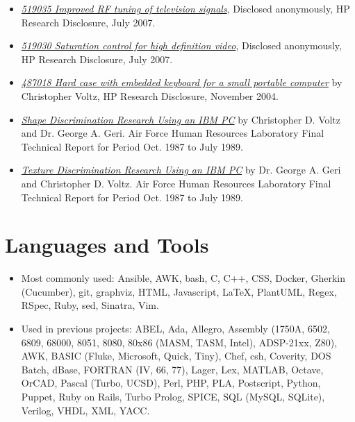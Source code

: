 \documentclass[10pt,letterpaper,oneside]{report}
\begin{document}
\begin{itemize}
  \item \href{http://voltz.ws/resume/RD519035.pdf}
    {\textit{519035 Improved RF tuning of television signals}}, Disclosed
    anonymously, HP Research Disclosure, July 2007.

  \item \href{http://voltz.ws/resume/RD519030.pdf}
    {\textit{519030 Saturation control for high definition video}}, Disclosed
    anonymously, HP Research Disclosure, July 2007.

  \item \href{http://voltz.ws/resume/RD487018.pdf}
    {\textit{487018 Hard case with embedded keyboard for a small portable
    computer}} by Christopher Voltz, HP Research Disclosure, November 2004.

  \item \href{http://www.dtic.mil/docs/citations/ADA219993}
    {\textit{Shape Discrimination Research Using an IBM PC}} by Christopher D.
    Voltz and Dr.  George A. Geri. Air Force Human Resources Laboratory Final
    Technical Report for Period Oct. 1987 to July 1989.

  \item \href{http://www.dtic.mil/docs/citations/ADA224347}
    {\textit{Texture Discrimination Research Using an IBM PC}} by Dr. George A.
    Geri and Christopher D. Voltz. Air Force Human Resources Laboratory Final
    Technical Report for Period Oct. 1987 to July 1989.
\end{itemize}

\section{Languages and Tools}

\begin{itemize}
  \item Most commonly used: Ansible, AWK, bash, C, C++, CSS, Docker, Gherkin
    (Cucumber), git, graphviz, HTML, Javascript, \LaTeX, PlantUML, Regex, RSpec,
    Ruby, sed, Sinatra, Vim.

  \item Used in previous projects: ABEL, Ada, Allegro, Assembly (1750A, 6502,
    6809, 68000, 8051, 8080, 80x86 (MASM, TASM, Intel), ADSP-21xx, Z80), AWK,
    BASIC (Fluke, Microsoft, Quick, Tiny), Chef, csh, Coverity, DOS Batch,
    dBase, FORTRAN (IV, 66, 77), Lager, Lex, MATLAB, Octave, OrCAD, Pascal
    (Turbo, UCSD), Perl, PHP, PLA, Postscript, Python, Puppet, Ruby on Rails,
    Turbo Prolog, SPICE, SQL (MySQL, SQLite), Verilog, VHDL, XML, YACC.
  \end{itemize}
\end{document}

